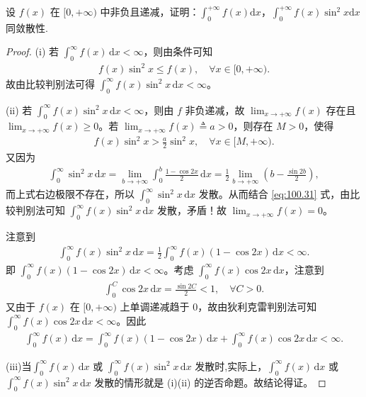 \documentclass[../../main.tex]{subfiles}
\begin{document}
\begin{example}
设 \(f(x)\) 在 \([0,+\infty)\) 中非负且递减，证明：\(\int_{0}^{+\infty} f(x) \mathrm{d}x\)，\(\int_{0}^{+\infty} f(x)\sin^{2}x \mathrm{d}x\) 同敛散性. 
\end{example}
\begin{proof}
(i) 若 \(\int_0^\infty f(x) \, \mathrm{d}x < \infty\)，则由条件可知
\begin{align*}
f(x) \sin^2 x \leqslant f(x), \quad \forall x \in [0, +\infty).
\end{align*}
故由比较判别法可得 \(\int_0^\infty f(x) \sin^2 x \, \mathrm{d}x < \infty\)。

(ii) 若 \(\int_0^\infty f(x) \sin^2 x \, \mathrm{d}x < \infty\)，则由 \(f\) 非负递减，故 \(\lim_{x \to +\infty} f(x)\) 存在且 \(\lim_{x \to +\infty} f(x) \geqslant 0\)。若 \(\lim_{x \to +\infty} f(x) \triangleq a > 0\)，则存在 \(M > 0\)，使得
\begin{align}
f(x) \sin^2 x > \frac{a}{2} \sin^2 x, \quad \forall x \in [M, +\infty). \label{eq:100.31}
\end{align}
又因为
\begin{align*}
\int_0^\infty \sin^2 x \, \mathrm{d}x = \lim_{b \to +\infty} \int_0^b \frac{1 - \cos 2x}{2} \, \mathrm{d}x = \frac{1}{2} \lim_{b \to +\infty} \left( b - \frac{\sin 2b}{2} \right),
\end{align*}
而上式右边极限不存在，所以 \(\int_0^\infty \sin^2 x \, \mathrm{d}x\) 发散。从而结合 \eqref{eq:100.31} 式，由比较判别法可知 \(\int_0^\infty f(x) \sin^2 x \, \mathrm{d}x\) 发散，矛盾！故 \(\lim_{x \to +\infty} f(x) = 0\)。

注意到
\begin{align*}
\int_0^\infty f(x) \sin^2 x \, \mathrm{d}x = \frac{1}{2} \int_0^\infty f(x) (1 - \cos 2x) \, \mathrm{d}x < \infty.
\end{align*}
即 \(\int_0^\infty f(x) (1 - \cos 2x) \, \mathrm{d}x < \infty\)。考虑 \(\int_0^\infty f(x) \cos 2x \, \mathrm{d}x\)，注意到
\begin{align*}
\int_0^C \cos 2x \, \mathrm{d}x = \frac{\sin 2C}{2} < 1, \quad \forall C > 0.
\end{align*}
又由于 \(f(x)\) 在 \([0, +\infty)\) 上单调递减趋于 0，故由狄利克雷判别法可知 \(\int_0^\infty f(x) \cos 2x \, \mathrm{d}x < \infty\)。因此
\begin{align*}
\int_0^\infty f(x) \, \mathrm{d}x = \int_0^\infty f(x) (1 - \cos 2x) \, \mathrm{d}x + \int_0^\infty f(x) \cos 2x \, \mathrm{d}x < \infty.
\end{align*}

(iii)当\(\int_0^\infty f(x) \, \mathrm{d}x\) 或 \(\int_0^\infty f(x) \sin^2 x \, \mathrm{d}x\) 发散时,实际上，\(\int_0^\infty f(x) \, \mathrm{d}x\) 或 \(\int_0^\infty f(x) \sin^2 x \, \mathrm{d}x\) 发散的情形就是 (i)(ii) 的逆否命题。故结论得证。
\end{proof}
\end{document}
